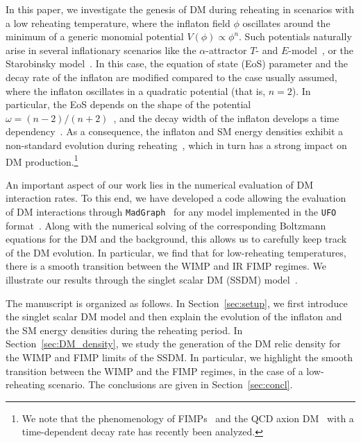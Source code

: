 \documentclass[a4paper,11pt]{article}
\begin{document}
In this paper, we investigate the genesis of DM during reheating in scenarios with a low reheating temperature, where the inflaton field $\phi$ oscillates around the minimum of a generic monomial potential $V(\phi) \propto \phi^n$.
Such potentials naturally arise in several inflationary scenarios like the $\alpha$-attractor $T$- and $E$-model~\cite{Kallosh:2013hoa, Kallosh:2013maa, Kallosh:2013yoa}, or the Starobinsky model~\cite{Starobinsky:1980te, Starobinsky:1981vz, Starobinsky:1983zz, Kofman:1985aw}.
In this case, the equation of state (EoS) parameter and the decay rate of the inflaton are modified compared to the case usually assumed, where the inflaton oscillates in a quadratic potential (that is, $n = 2$). In particular, the EoS depends on the shape of the potential $\omega = (n-2)/(n+2)$~\cite{Turner:1983he}, and the decay width of the inflaton develops a time dependency~\cite{Garcia:2020eof, Garcia:2020wiy}. As a consequence, the inflaton and SM energy densities exhibit a non-standard evolution during reheating~\cite{Co:2020xaf}, which in turn has a strong impact on DM production.\footnote{We note that the phenomenology of FIMPs~\cite{Garcia:2020eof, Garcia:2020wiy, Ahmed:2021fvt, Barman:2022tzk, Ahmed:2022tfm, Becker:2023tvd} and the QCD axion DM~\cite{Arias:2022qjt} with a time-dependent decay rate has recently been analyzed.}

An important aspect of our work lies in the numerical evaluation of DM interaction rates. To this end, we have developed a code allowing the evaluation of DM interactions through \texttt{MadGraph}~\cite{Alwall:2014hca} for any model implemented in the \texttt{UFO} format~\cite{Degrande:2011ua}. Along with the numerical solving of the corresponding Boltzmann equations for the DM and the background, this allows us to carefully keep track of the DM evolution. In particular, we find that for low-reheating temperatures, there is a smooth transition between the WIMP and IR FIMP regimes. We illustrate our results through the singlet scalar DM (SSDM) model~\cite{Silveira:1985rk, McDonald:1993ex, Burgess:2000yq}.

The manuscript is organized as follows. In Section~\ref{sec:setup}, we first introduce the singlet scalar DM model and then explain the evolution of the inflaton and the SM energy densities during the reheating period. In Section~\ref{sec:DM_density}, we study the generation of the DM relic density for the WIMP and FIMP limits of the SSDM. In particular, we highlight the smooth transition between the WIMP and the FIMP regimes, in the case of a low-reheating scenario.
The conclusions are given in Section~\ref{sec:concl}.
\end{document}
